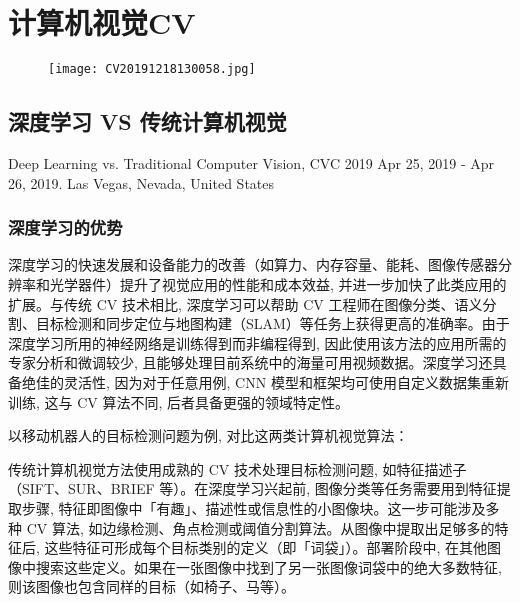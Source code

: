 \chapter{计算机视觉CV}\label{AIChapter11}
\begin{figure}[H]
\centering
\texttt{[image: CV20191218130058.jpg]}
\label{CV20191218130058}
\end{figure}
\newpage
\section{深度学习 VS 传统计算机视觉}
Deep Learning vs. Traditional Computer Vision, CVC 2019  Apr 25, 2019 - Apr 26, 2019. Las Vegas, Nevada, United States \cite{MahonyCVC2019}
\subsection{深度学习的优势}

深度学习的快速发展和设备能力的改善（如算力、内存容量、能耗、图像传感器分辨率和光学器件）提升了视觉应用的性能和成本效益, 并进一步加快了此类应用的扩展。与传统 CV 技术相比, 深度学习可以帮助 CV 工程师在图像分类、语义分割、目标检测和同步定位与地图构建（SLAM）等任务上获得更高的准确率。由于深度学习所用的神经网络是训练得到而非编程得到, 因此使用该方法的应用所需的专家分析和微调较少, 且能够处理目前系统中的海量可用视频数据。深度学习还具备绝佳的灵活性, 因为对于任意用例, CNN 模型和框架均可使用自定义数据集重新训练, 这与 CV 算法不同, 后者具备更强的领域特定性。

以移动机器人的目标检测问题为例, 对比这两类计算机视觉算法：

传统计算机视觉方法使用成熟的 CV 技术处理目标检测问题, 如特征描述子（SIFT、SUR、BRIEF 等）。在深度学习兴起前, 图像分类等任务需要用到特征提取步骤, 特征即图像中「有趣」、描述性或信息性的小图像块。这一步可能涉及多种 CV 算法, 如边缘检测、角点检测或阈值分割算法。从图像中提取出足够多的特征后, 这些特征可形成每个目标类别的定义（即「词袋」）。部署阶段中, 在其他图像中搜索这些定义。如果在一张图像中找到了另一张图像词袋中的绝大多数特征, 则该图像也包含同样的目标（如椅子、马等）。

